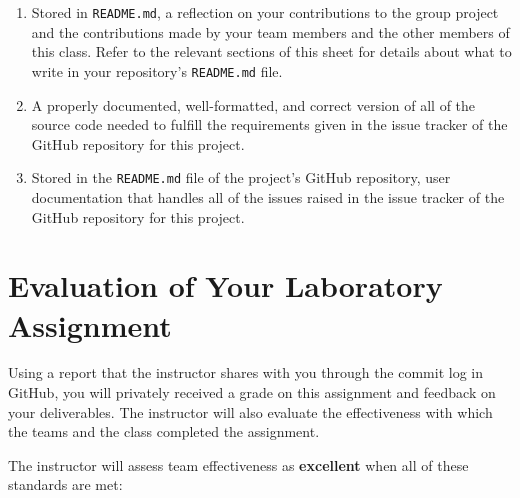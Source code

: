 \documentclass[11pt]{article}
\newcommand{\reflection}{\lstinline{README.md}}
\begin{document}
\begin{enumerate}

\setlength{\itemsep}{0in}

\item Stored in \reflection{}, a reflection on your contributions to the group project and the contributions made by
  your team members and the other members of this class. Refer to the relevant sections of this sheet for details about
  what to write in your repository's \reflection{} file.

\item A properly documented, well-formatted, and correct version of all of the source code needed to fulfill the
  requirements given in the issue tracker of the GitHub repository for this project.

\item Stored in the \reflection{} file of the project's GitHub repository, user documentation that handles all of the
  issues raised in the issue tracker of the GitHub repository for this project.

\end{enumerate}

\vspace*{-1em}

\section*{Evaluation of Your Laboratory Assignment}

Using a report that the instructor shares with you through the commit log in GitHub, you will privately received a grade
on this assignment and feedback on your deliverables. The instructor will also evaluate the effectiveness with which the
teams and the class completed the assignment.


The instructor will assess team effectiveness as {\bf excellent} when all of these standards are met:

\vspace*{-.5em}
\end{document}
